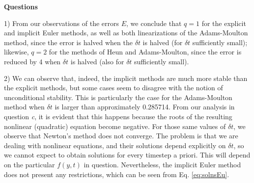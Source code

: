 \documentclass[a4paper,10pt]{article}
\begin{document}
\vspace{10mm}

\textbf{Questions}

\vspace{5mm}

1) From our observations of the errors $E$, we conclude that $q=1$ for the explicit and implicit Euler methods, as well as both linearizations of the Adams-Moulton method, since the error is halved when the $\delta t$ is halved (for $\delta t$ sufficiently small); likewise, $q=2$ for the methods of Heun and Adams-Moulton, since the error is reduced by 4 when $\delta t$ is halved (also for $\delta t$ sufficiently small).

\vspace{3mm}

2) We can observe that, indeed, the implicit methods are much more stable than the explicit methods, but some cases seem to disagree with the notion of unconditional stability. This is particularly the case for the Adams-Moulton method when $\delta t$ is larger than approximately 0.285714. From our analysis in question \textit{c}, it is evident that this happens because the roots of the resulting nonlinear (quadratic) equation become negative. For those same values of $\delta t$, we observe that Newton's method does not converge. The problem is that we are dealing with nonlinear equations, and their solutions depend explicitly on $\delta t$, so we cannot expect to obtain solutions for every timestep a priori. This will depend on the particular $f(y,t)$ in question. Nevertheless, the implicit Euler method does not present any restrictions, which can be seen from Eq. \eqref{eq:solnsEu}.

\vspace{3mm}
\end{document}

